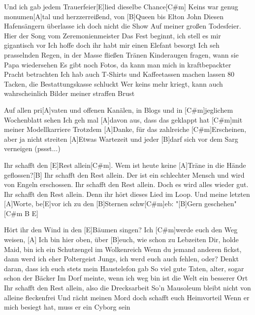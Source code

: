 



\begin{guitar}
	Und ich gab jedem Trauerfeier[E]lied dieselbe Chance[C#m]{}
	Keins war genug monumen[A]tal und herzzerreißend, von [B]Queen bis Elton John
	Diesen Hafensängern überlasse ich doch nicht die Show
	Auf meiner großen Todesfeier. Hier der Song vom Zeremonienmeister
	Das Fest beginnt, ich stell es mir gigantisch vor
	Ich hoffe doch ihr habt mir einen Elefant besorgt
	Ich seh prasselnden Regen, in der Masse fließen Tränen
	Kinderaugen fragen, wann sie Papa wiedersehen
	Es gibt noch Fotos, da kann man mich in kraftbepackter Pracht betrachten
	Ich hab auch T-Shirts und Kaffeetassen machen lassen
	80 Tacken, die Bestattungskasse schluckt
	Wer keins mehr kriegt, kann auch wahrscheinlich Bilder meiner straffen Brust
	
	Auf allen pri[A]vaten und offenen Kanälen, in Blogs und in [C#m]jeglichem Wochenblatt sehen
	Ich geh mal [A]davon aus, dass das geklappt hat [C#m]mit meiner Modellkarriere
	Trotzdem [A]Danke, für das zahlreiche [C#m]Erscheinen, aber ja nicht streiten
	[A]Etwas Wartezeit und jeder [B]darf sich vor dem Sarg verneigen (pssst...)
	
	Ihr schafft den [E]Rest allein[C#m].
	Wem ist heute keine [A]Träne in die Hände geflossen?[B]{}
	Ihr schafft den Rest allein.
	Der ist ein schlechter Mensch und wird von Engeln erschossen.
	Ihr schafft den Rest allein.
	Doch es wird alles wieder gut.
	Ihr schafft den Rest allein.
	Denn ihr hört dieses Lied im Loop.
	Und meine letzten [A]Worte, be[E]vor ich zu den [B]Sternen schw[C#m]eb:
	"[B]Gern geschehen"[C#m B E]{}
	
	Hört ihr den Wind in den [E]Bäumen singen? Ich [C#m]werde euch den Weg weisen, 
	[A] Ich bin hier oben, über [B]euch, wie schon zu Lebzeiten
	Dir, holde Maid, bin ich ein Schutzengel im Wolkenreich
	Wenn du jemand anderen fickst, dann werd ich eher Poltergeist
	Jungs, ich werd euch auch fehlen, oder?
	Denkt daran, dass ich euch stets mein Haustelefon gab
	So viel gute Taten, alter, sogar schon der Bäcker
	Im Dorf meinte, wenn ich weg bin ist die Welt ein besserer Ort
	Ihr schafft den Rest allein, also die Drecksarbeit
	So'n Mausoleum bleibt nicht von alleine fleckenfrei
	Und rächt meinen Mord doch schafft euch Heimvorteil
	Wenn er mich besiegt hat, muss er ein Cyborg sein
	

\end{guitar}
